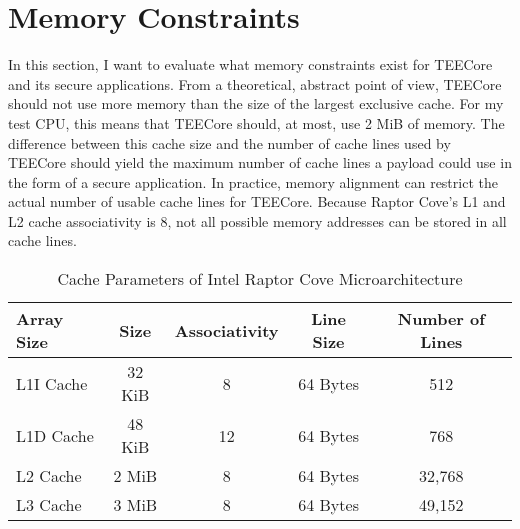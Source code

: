 \section{Memory Constraints}
\label{eval:mem_constraints}
In this section, I want to evaluate what memory constraints exist for TEECore
and its secure applications. From a theoretical, abstract point of view, TEECore
should not use more memory than the size of the largest exclusive cache. For my
test CPU, this means that TEECore should, at most, use 2 MiB of memory. The
difference between this cache size and the number of cache lines used by TEECore
should yield the maximum number of cache lines a payload could use in the form
of a secure application. In practice, memory alignment can restrict the actual
number of usable cache lines for TEECore. Because Raptor Cove's L1 and L2 cache
associativity is 8, not all possible memory addresses can be stored in all cache
lines.\\

\begin{table}[ht]
  \centering
  \begin{tabular}{ |l||c|c|c|c| }
    \hline
    Array Size & Size   & Associativity   & Line Size & Number of Lines \\
    \hline
    L1I Cache  & 32 KiB & 8               & 64 Bytes  & 512             \\
    L1D Cache  & 48 KiB & 12\footnotemark & 64 Bytes  & 768             \\
    L2 Cache   & 2 MiB  & 8               & 64 Bytes  & 32,768          \\
    L3 Cache   & 3 MiB  & 8               & 64 Bytes  & 49,152          \\
    \hline
  \end{tabular}
  \caption{Cache Parameters of Intel Raptor Cove Microarchitecture}
  \label{50:tab:cache_size}
\end{table}

